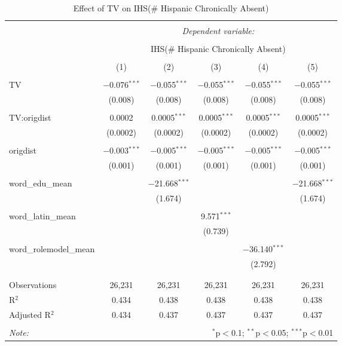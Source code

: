 
\begin{table}[!htbp] \centering 
  \caption{Effect of TV on IHS(\# Hispanic Chronically Absent)} 
  \label{} 
\begin{tabular}{@{\extracolsep{-2pt}}lccccc} 
\\[-1.8ex]\hline 
\hline \\[-1.8ex] 
 & \multicolumn{5}{c}{\textit{Dependent variable:}} \\ 
\cline{2-6} 
\\[-1.8ex] & \multicolumn{5}{c}{IHS(\# Hispanic Chronically Absent)} \\ 
\\[-1.8ex] & (1) & (2) & (3) & (4) & (5)\\ 
\hline \\[-1.8ex] 
 TV & $-$0.076$^{***}$ & $-$0.055$^{***}$ & $-$0.055$^{***}$ & $-$0.055$^{***}$ & $-$0.055$^{***}$ \\ 
  & (0.008) & (0.008) & (0.008) & (0.008) & (0.008) \\ 
  & & & & & \\ 
 TV:origdist & 0.0002 & 0.0005$^{***}$ & 0.0005$^{***}$ & 0.0005$^{***}$ & 0.0005$^{***}$ \\ 
  & (0.0002) & (0.0002) & (0.0002) & (0.0002) & (0.0002) \\ 
  & & & & & \\ 
 origdist & $-$0.003$^{***}$ & $-$0.005$^{***}$ & $-$0.005$^{***}$ & $-$0.005$^{***}$ & $-$0.005$^{***}$ \\ 
  & (0.001) & (0.001) & (0.001) & (0.001) & (0.001) \\ 
  & & & & & \\ 
 word\_edu\_mean &  & $-$21.668$^{***}$ &  &  & $-$21.668$^{***}$ \\ 
  &  & (1.674) &  &  & (1.674) \\ 
  & & & & & \\ 
 word\_latin\_mean &  &  & 9.571$^{***}$ &  &  \\ 
  &  &  & (0.739) &  &  \\ 
  & & & & & \\ 
 word\_rolemodel\_mean &  &  &  & $-$36.140$^{***}$ &  \\ 
  &  &  &  & (2.792) &  \\ 
  & & & & & \\ 
\hline \\[-1.8ex] 
Observations & 26,231 & 26,231 & 26,231 & 26,231 & 26,231 \\ 
R$^{2}$ & 0.434 & 0.438 & 0.438 & 0.438 & 0.438 \\ 
Adjusted R$^{2}$ & 0.434 & 0.437 & 0.437 & 0.437 & 0.437 \\ 
\hline 
\hline \\[-1.8ex] 
\textit{Note:}  & \multicolumn{5}{r}{$^{*}$p$<$0.1; $^{**}$p$<$0.05; $^{***}$p$<$0.01} \\ 
\end{tabular} 
\end{table} 
